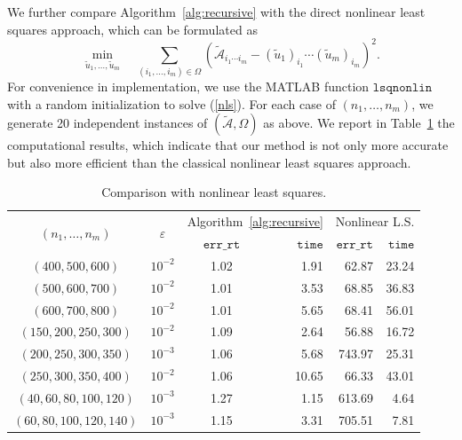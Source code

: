 \documentclass{amsart}
\newcommand{\vareps}{\varepsilon}
\newcommand{\tu}{\tilde{u}}
\newcommand{\mt}[1]{\mathtt{#1}}
\newcommand{\reff}[1]{(\ref{#1})}
\newcommand{\mc}[1]{\mathcal{#1}}
\newcommand{\ddd}{,\ldots,}
\newcommand{\be}{\begin{equation}}
\newcommand{\ee}{\end{equation}}
\theoremstyle{definition}
\numberwithin{equation}{section}
\begin{document}
We further compare Algorithm~\ref{alg:recursive} with the direct nonlinear least squares approach,
which can be formulated as
\be\label{nls}
\min_{\tu_1 \ddd \tu_m} \quad 
\sum_{(i_1 \ddd i_m) \in \Omega}
\left( \widetilde{\mc A}_{i_1 \cdots i_m} - (\tu_1)_{i_1} \cdots (\tu_m)_{i_m} \right)^2.
\ee
For convenience in implementation, 
we use the MATLAB function $\mt{lsqnonlin}$ with a random initialization to solve \reff{nls}.
For each case of $(n_1 \ddd n_m)$, 
we generate 20 independent instances of $(\widetilde{\mc{A}},\Omega)$ as above.
We report in Table~\ref{tab:compare_nls} the computational results,
which indicate that our method is not only more accurate 
but also more efficient than the classical nonlinear least squares approach.


\begin{table}[htb]
\caption{Comparison with nonlinear least squares.}
\label{tab:compare_nls}
\centering
\begin{tabular}{cccrrr}
\toprule
\multirow{2}{*}{$(n_1 \ddd n_m)$}
& \multirow{2}{*}{$\vareps$} 
& \multicolumn{2}{c}{Algorithm~\ref{alg:recursive}}
& \multicolumn{2}{c}{Nonlinear L.S.} \\
\cmidrule(lr){3-4} \cmidrule(lr){5-6}
&& $\mt{err\_rt}$ & $\mt{time}$
& $\mt{err\_rt}$ & $\mt{time}$ \\
\midrule
$(400, 500, 600)$ & $10^{-2}$ & 1.02 & 1.91 & 62.87 & 23.24 \\
\midrule
$(500, 600, 700)$ & $10^{-2}$ & 1.01 & 3.53 & 68.85 & 36.83 \\
\midrule
$(600, 700, 800)$ & $10^{-2}$ & 1.01 & 5.65 & 68.41 & 56.01 \\
\midrule
$(150, 200, 250, 300)$ & $10^{-2}$ & 1.09 & 2.64 & 56.88 & 16.72 \\
\midrule
$(200, 250, 300, 350)$ & $10^{-3}$ & 1.06 & 5.68 & 743.97 & 25.31 \\
\midrule
$(250, 300, 350, 400)$ & $10^{-2}$ & 1.06 & 10.65 & 66.33 & 43.01 \\
\midrule
$(40, 60, 80, 100, 120)$ & $10^{-3}$ & 1.27 & 1.15 & 613.69 & 4.64 \\
\midrule
$(60, 80, 100, 120, 140)$ & $10^{-3}$ & 1.15 & 3.31 & 705.51 & 7.81 \\
\bottomrule
\end{tabular}
\end{table}
\end{document}
